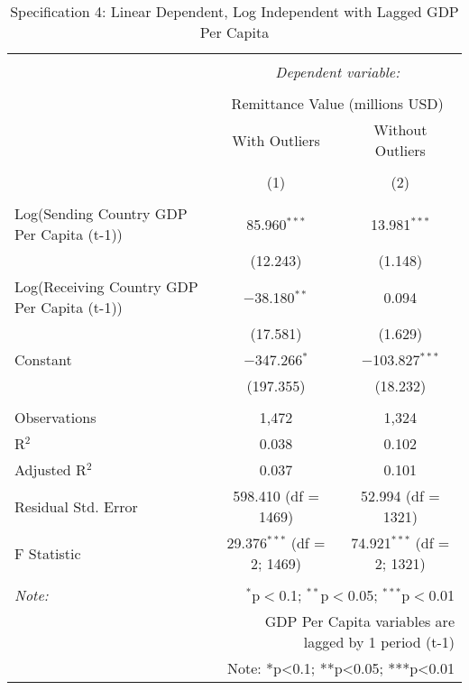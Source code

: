 
\begin{table}[!htbp] \centering 
  \caption{Specification 4: Linear Dependent, Log Independent with Lagged GDP Per Capita} 
  \label{} 
\begin{tabular}{@{\extracolsep{5pt}}lcc} 
\\[-1.8ex]\hline 
\hline \\[-1.8ex] 
 & \multicolumn{2}{c}{\textit{Dependent variable:}} \\ 
\cline{2-3} 
\\[-1.8ex] & \multicolumn{2}{c}{Remittance Value (millions USD)} \\ 
 & With Outliers & Without Outliers \\ 
\\[-1.8ex] & (1) & (2)\\ 
\hline \\[-1.8ex] 
 Log(Sending Country GDP Per Capita (t-1)) & 85.960$^{***}$ & 13.981$^{***}$ \\ 
  & (12.243) & (1.148) \\ 
  Log(Receiving Country GDP Per Capita (t-1)) & $-$38.180$^{**}$ & 0.094 \\ 
  & (17.581) & (1.629) \\ 
  Constant & $-$347.266$^{*}$ & $-$103.827$^{***}$ \\ 
  & (197.355) & (18.232) \\ 
 \hline \\[-1.8ex] 
Observations & 1,472 & 1,324 \\ 
R$^{2}$ & 0.038 & 0.102 \\ 
Adjusted R$^{2}$ & 0.037 & 0.101 \\ 
Residual Std. Error & 598.410 (df = 1469) & 52.994 (df = 1321) \\ 
F Statistic & 29.376$^{***}$ (df = 2; 1469) & 74.921$^{***}$ (df = 2; 1321) \\ 
\hline 
\hline \\[-1.8ex] 
\textit{Note:}  & \multicolumn{2}{r}{$^{*}$p$<$0.1; $^{**}$p$<$0.05; $^{***}$p$<$0.01} \\ 
 & \multicolumn{2}{r}{GDP Per Capita variables are lagged by 1 period (t-1)} \\ 
 & \multicolumn{2}{r}{Note: *p<0.1; **p<0.05; ***p<0.01} \\ 
\end{tabular} 
\end{table} 
